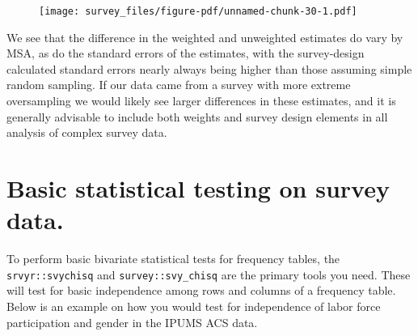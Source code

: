 \documentclass[
  letterpaper,
  DIV=11,
  numbers=noendperiod]{scrreprt}
\begin{document}
\begin{figure}[H]

{\centering \texttt{[image: survey\_files/figure-pdf/unnamed-chunk-30-1.pdf]}

}

\end{figure}

We see that the difference in the weighted and unweighted estimates do
vary by MSA, as do the standard errors of the estimates, with the
survey-design calculated standard errors nearly always being higher than
those assuming simple random sampling. If our data came from a survey
with more extreme oversampling we would likely see larger differences in
these estimates, and it is generally advisable to include both weights
and survey design elements in all analysis of complex survey data.

\hypertarget{basic-statistical-testing-on-survey-data.}{%
\section{Basic statistical testing on survey
data.}\label{basic-statistical-testing-on-survey-data.}}

To perform basic bivariate statistical tests for frequency tables, the
\texttt{srvyr::svychisq} and \texttt{survey::svy\_chisq} are the primary
tools you need. These will test for basic independence among rows and
columns of a frequency table. Below is an example on how you would test
for independence of labor force participation and gender in the IPUMS
ACS data.
\end{document}
